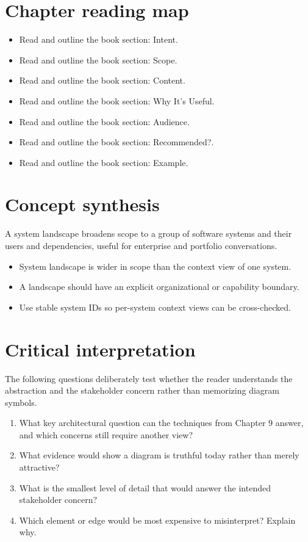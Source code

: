 \documentclass[10pt,letterpaper]{article}
\begin{document}
\section{Chapter reading map}
\begin{itemize}
\item Read and outline the book section: Intent.
\item Read and outline the book section: Scope.
\item Read and outline the book section: Content.
\item Read and outline the book section: Why It’s Useful.
\item Read and outline the book section: Audience.
\item Read and outline the book section: Recommended?.
\item Read and outline the book section: Example.
\end{itemize}

\section{Concept synthesis}
A system landscape broadens scope to a group of software systems and their users and dependencies, useful for enterprise and portfolio conversations.

\begin{itemize}
\item System landscape is wider in scope than the context view of one system.
\item A landscape should have an explicit organizational or capability boundary.
\item Use stable system IDs so per-system context views can be cross-checked.
\end{itemize}

\section{Critical interpretation}
The following questions deliberately test whether the reader understands the abstraction and the stakeholder concern rather than memorizing diagram symbols.

\begin{enumerate}
\item What key architectural question can the techniques from Chapter 9 answer, and which concerns still require another view?
\item What evidence would show a diagram is truthful today rather than merely attractive?
\item What is the smallest level of detail that would answer the intended stakeholder concern?
\item Which element or edge would be most expensive to misinterpret? Explain why.
\end{enumerate}
\end{document}
